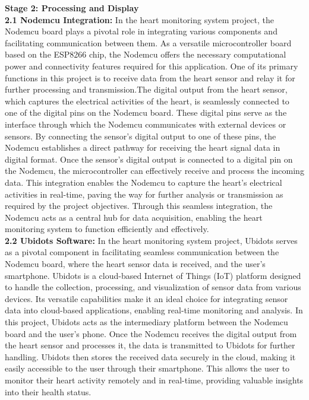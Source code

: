 \textbf{Stage 2: Processing and Display}
\\
\textbf{2.1 Nodemcu Integration:} In the heart monitoring system project, the Nodemcu board plays a pivotal role in integrating various components and facilitating communication between them. As a versatile microcontroller board based on the ESP8266 chip, the Nodemcu offers the necessary computational power and connectivity features required for this application. One of its primary functions in this project is to receive data from the heart sensor and relay it for further processing and transmission.The digital output from the heart sensor, which captures the electrical activities of the heart, is seamlessly connected to one of the digital pins on the Nodemcu board. These digital pins serve as the interface through which the Nodemcu communicates with external devices or sensors. By connecting the sensor's digital output to one of these pins, the Nodemcu establishes a direct pathway for receiving the heart signal data in digital format.
Once the sensor's digital output is connected to a digital pin on the Nodemcu, the microcontroller can effectively receive and process the incoming data. This integration enables the Nodemcu to capture the heart's electrical activities in real-time, paving the way for further analysis or transmission as required by the project objectives. Through this seamless integration, the Nodemcu acts as a central hub for data acquisition, enabling the heart monitoring system to function efficiently and effectively.
\\
 \textbf{2.2 Ubidots Software:} In the heart monitoring system project, Ubidots serves as a pivotal component in facilitating seamless communication between the Nodemcu board, where the heart sensor data is received, and the user's smartphone. Ubidots is a cloud-based Internet of Things (IoT) platform designed to handle the collection, processing, and visualization of sensor data from various devices. Its versatile capabilities make it an ideal choice for integrating sensor data into cloud-based applications, enabling real-time monitoring and analysis.
 In this project, Ubidots acts as the intermediary platform between the Nodemcu board and the user's phone. Once the Nodemcu receives the digital output from the heart sensor and processes it, the data is transmitted to Ubidots for further handling. Ubidots then stores the received data securely in the cloud, making it easily accessible to the user through their smartphone. This allows the user to monitor their heart activity remotely and in real-time, providing valuable insights into their health status.
